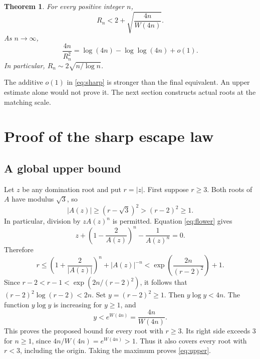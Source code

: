 \documentclass[11pt,a4paper]{article}
\newtheorem{theorem}{Theorem}
\begin{document}
\begin{theorem}\label{thm:escape}
For every positive integer $n$,
\begin{equation}\label{eq:upper}
 R_n<2+\sqrt{\frac{4n}{W(4n)}}.
\end{equation}
As $n\to\infty$,
\begin{equation}\label{eq:sharp}
 \frac{4n}{R_n^2}=\log(4n)-\log\log(4n)+o(1).
\end{equation}
In particular, $R_n\sim2\sqrt{n/\log n}$.
\end{theorem}
The additive $o(1)$ in \eqref{eq:sharp} is stronger than the final equivalent.
An upper estimate alone would not prove it. The next section constructs
actual roots at the matching scale.

\section{Proof of the sharp escape law}
\subsection{A global upper bound}
Let $z$ be any domination root and put $r=|z|$. First suppose $r\ge3$.
Both roots of $A$ have modulus $\sqrt3$, so
\[
 |A(z)|\ge(r-\sqrt3)^2>(r-2)^2\ge1.
\]
In particular, division by $zA(z)^n$ is permitted. Equation \eqref{eq:flower} gives
\[
 z+\left(1-\frac2{A(z)}\right)^n-\frac1{A(z)^n}=0.
\]
Therefore
\[
 r\le\left(1+\frac2{|A(z)|}\right)^n+|A(z)|^{-n}
 <\exp\left(\frac{2n}{(r-2)^2}\right)+1.
\]
Since $r-2<r-1<\exp(2n/(r-2)^2)$, it follows that
$(r-2)^2\log(r-2)<2n$. Set $y=(r-2)^2\ge1$.
Then $y\log y<4n$. The function $y\log y$ is increasing for $y\ge1$, and
\[
 y<e^{W(4n)}=\frac{4n}{W(4n)}.
\]
This proves the proposed bound for every root with $r\ge3$.
Its right side exceeds $3$ for $n\ge1$, since
$4n/W(4n)=e^{W(4n)}>1$. Thus it also covers every root with $r<3$,
including the origin. Taking the maximum proves \eqref{eq:upper}.
\end{document}
